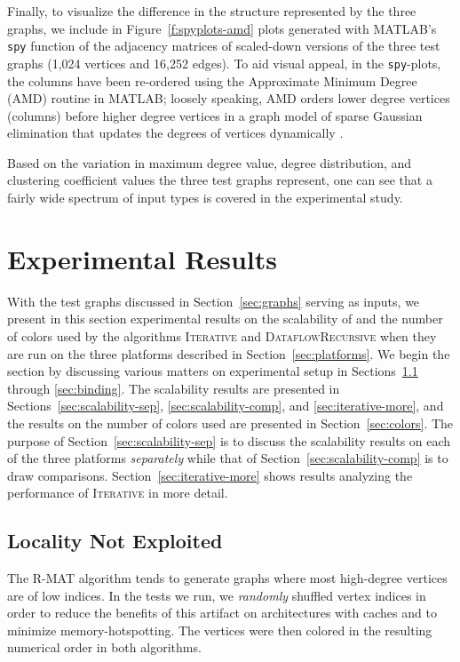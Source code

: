 \documentclass{article}
\begin{document}
Finally, to visualize the difference in the structure represented by the three graphs,
we include in Figure~\ref{f:spyplots-amd} plots generated with
MATLAB's {\tt spy} function of the adjacency matrices of scaled-down versions of the three
test graphs (1,024 vertices and 16,252 edges). 
To aid visual appeal, in the {\tt spy}-plots, the columns have been re-ordered
using the Approximate Minimum Degree (AMD) routine in MATLAB;  loosely speaking, 
AMD orders lower degree vertices (columns) before higher degree vertices 
in a graph model of sparse Gaussian elimination that updates 
the degrees of vertices dynamically \cite{amestoy+}. 

Based on the variation in maximum degree value, degree distribution, and
clustering coefficient values the three test graphs represent, one can see that a 
fairly wide spectrum of input types is covered in the experimental study.

\section{Experimental Results}
\label{sec:results}

With the test graphs discussed in Section~\ref{sec:graphs} serving as inputs, 
we present in this section experimental results on the scalability of and the number of colors 
used  by the algorithms \textsc{Iterative} and \textsc{DataflowRecursive}
when they are run on the three platforms described in Section~\ref{sec:platforms}. 
We begin the section by discussing various matters on experimental setup 
in Sections~\ref{sec:locality} through \ref{sec:binding}.
The scalability results are presented in 
Sections~\ref{sec:scalability-sep}, \ref{sec:scalability-comp}, and \ref{sec:iterative-more}, 
and the results on the number of colors used are presented in Section~\ref{sec:colors}.
The purpose of Section~\ref{sec:scalability-sep} is to discuss the
scalability results on each of the three platforms {\em separately} while that of
Section~\ref{sec:scalability-comp} is to draw comparisons.
Section~\ref{sec:iterative-more} shows results analyzing the performance of 
\textsc{Iterative} in more detail.

\subsection{Locality Not Exploited}
\label{sec:locality}

The R-MAT algorithm tends to generate graphs where most high-degree vertices are of low indices.  
In the tests we run, we {\em randomly} shuffled  vertex indices in order to reduce
the benefits of this artifact  on architectures with caches and to minimize memory-hotspotting.
The vertices were then colored in the resulting numerical order in both algorithms. 
\end{document}
